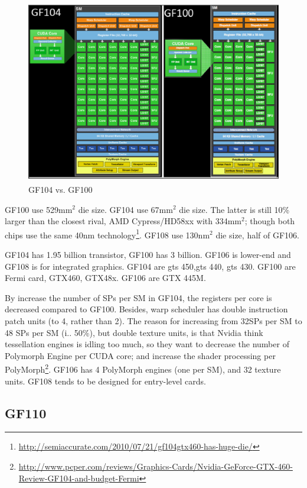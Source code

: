 \begin{figure}[hbt]
  \centerline{\includegraphics[height=8cm,
    angle=0]{./images/GF104_100.eps}}
\caption{GF104 vs. GF100}
\label{fig:GF104_100}
\end{figure}


\begin{framed}
GF100 use 529mm$^2$ die size. GF104 use 67mm$^2$ die size. The latter is
still 10\% larger than the closest rival, AMD Cypress/HD58xx with 334mm$^2$;
though both chips use the same 40nm
technology\footnote{\url{http://semiaccurate.com/2010/07/21/gf104gtx460-has-huge-die/}}.
GF108 use 130nm$^2$ die size, half of GF106.

GF104 has 1.95 billion transistor, GF100 has 3 billion. GF106 is lower-end and
GF108 is for integrated graphics. GF104 are gts 450,gts 440, gts 430. GF100
are Fermi card, GTX460, GTX48x. GF106 are GTX 445M.
\end{framed}

By increase the number of SPs per SM in GF104, the registers per core is
decreased compared to GF100. Besides, warp scheduler has double instruction
patch units (to 4, rather than 2). The reason for increasing from 32SPs per SM
to 48 SPs per SM (i.. 50\%), but double texture units, is that Nvidia think
tessellation engines is idling too much, so they want to decrease the number of Polymorph Engine per
CUDA core; and increase the shader processing per
PolyMorph\footnote{\url{http://www.pcper.com/reviews/Graphics-Cards/Nvidia-GeForce-GTX-460-Review-GF104-and-budget-Fermi}}.
GF106 has 4 PolyMorph engines (one per SM), and 32 texture units. GF108 tends to
be designed for entry-level cards. 

\subsection{GF110}
\label{sec:GF110}

